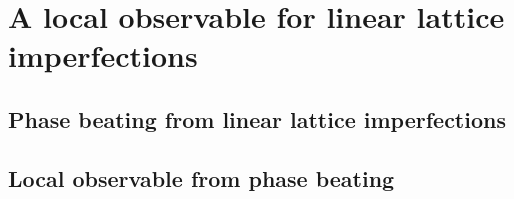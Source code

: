 \chapter{A local observable for linear lattice imperfections}
\label{ch_localobs}

\section{Phase beating from linear lattice imperfections}
\lipsum[11-20]

\section{Local observable from phase beating}
\lipsum[21-30]

